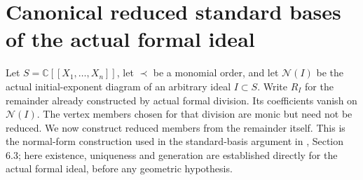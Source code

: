 \section{Canonical reduced standard bases of the actual formal ideal}

Let $S=\mathbb C[[X_1,\ldots,X_n]]$, let $\prec$ be a monomial
order, and let $\mathcal N(I)$ be the actual initial-exponent diagram
of an arbitrary ideal $I\subset S$. Write $R_I$ for the remainder
already constructed by actual formal division. Its coefficients vanish
on $\mathcal N(I)$. The vertex members chosen for that division are
monic but need not be reduced. We now construct reduced members from the
remainder itself. This is the normal-form construction used in the
standard-basis argument in \cite{bierstone-milman03-desingularization-algorithms},
Section 6.3; here existence, uniqueness and generation are established
directly for the actual formal ideal, before any geometric hypothesis.

